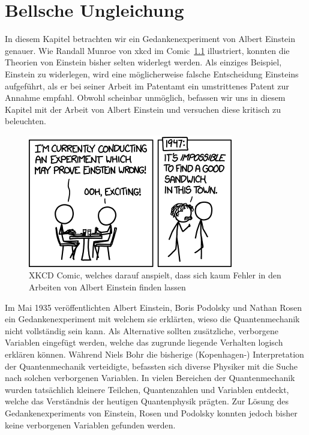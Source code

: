 \chapter{Bellsche Ungleichung\label{chapter:bell}}
\begin{refsection}

In diesem Kapitel betrachten wir ein Gedankenexperiment von Albert Einstein
genauer.
Wie Randall Munroe von xkcd im Comic~\ref{fig:bell:xkcd_einstein} illustriert,
konnten die Theorien von Einstein bisher selten widerlegt werden.
Als einziges Beispiel, Einstein zu widerlegen, wird eine m\"oglicherweise
falsche Entscheidung Einsteins aufgef\"uhrt, als er bei seiner Arbeit im
Patentamt ein umstrittenes Patent zur Annahme empfahl.
Obwohl scheinbar unm\"oglich, befassen wir uns in diesem Kapitel mit der Arbeit
von Albert Einstein und versuchen diese kritisch zu beleuchten.

\begin{figure}[b]
    \centering
    \includegraphics[width=0.5\linewidth]{bell/images/xkcd_einstein.png}
    \caption{XKCD Comic, welches darauf anspielt, dass sich kaum Fehler 
    in den Arbeiten von Albert Einstein finden lassen \cite{Bell:XkcdEinstein}}
    \label{fig:bell:xkcd_einstein}
\end{figure}

Im Mai 1935 ver\"offentlichten Albert Einstein, Boris Podolsky und
Nathan Rosen ein Gedankenexperiment mit welchem sie erkl\"arten, wieso
die Quantenmechanik nicht vollst\"andig sein kann. Als Alternative
sollten zus\"atzliche, verborgene Variablen eingef\"ugt werden, welche
das zugrunde liegende Verhalten logisch erkl\"aren k\"onnen.
W\"ahrend Niels Bohr die bisherige (Kopenhagen-) Interpretation der 
Quantenmechanik verteidigte, befassten sich diverse Physiker mit die Suche
nach solchen verborgenen Variablen.
In vielen Bereichen der Quantenmechanik wurden tats\"achlich
kleinere Teilchen, Quantenzahlen und Variablen entdeckt, welche das
Verst\"andnis der heutigen Quantenphysik pr\"agten.
Zur L\"osung des Gedankenexperiments von Einstein, Rosen und Podolsky konnten
jedoch bisher keine verborgenen Variablen gefunden werden.


\end{refsection}
